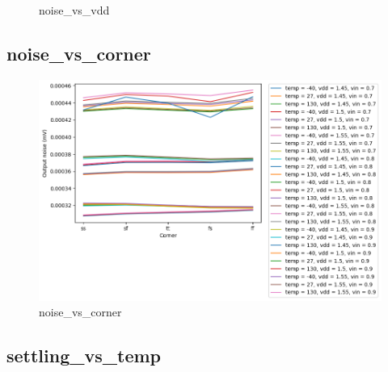 \documentclass[
  a4paper,
  DIV=11,
  numbers=noendperiod]{scrartcl}
\begin{document}
\begin{tcolorbox}
\begin{figure}[H]
{}

\caption{noise\_vs\_vdd}

\end{figure}%

\subsection*{noise\_vs\_corner}\label{noise_vs_corner}

\begin{figure}[H]

{\centering \includegraphics{./cace/_docs/ota-5t/schematic/noise_vs_corner.png}

}

\caption{noise\_vs\_corner}

\end{figure}%

\subsection*{settling\_vs\_temp}\label{settling_vs_temp}

\begin{figure}[H]


\end{figure}
\end{tcolorbox}
\end{document}
